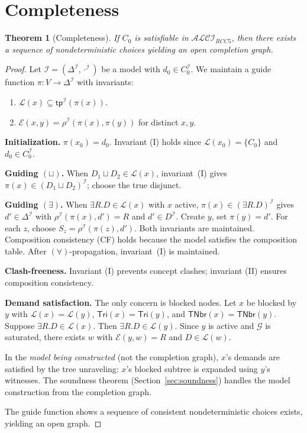 \documentclass[a4paper,11pt]{article}
\newtheorem{theorem}{Theorem}[section]
\theoremstyle{definition}
\newcommand{\ALCIRCC}[1]{\ensuremath{\mathcal{ALCI}_{\mathit{RCC#1}}}}
\newcommand{\tp}{\ensuremath{\mathsf{tp}}}
\newcommand{\Tri}{\ensuremath{\mathsf{Tri}}}
\newcommand{\TNbr}{\ensuremath{\mathsf{TNbr}}}
\newcommand{\interp}{\ensuremath{\mathcal{I}}}
\newcommand{\DeltaI}{\ensuremath{\Delta^{\mathcal{I}}}}
\newcommand{\GG}{\ensuremath{\mathcal{G}}}
\newcommand{\LL}{\ensuremath{\mathcal{L}}}
\newcommand{\EE}{\ensuremath{\mathcal{E}}}
\begin{document}
\section{Completeness}\label{sec:completeness}

\begin{theorem}[Completeness]\label{thm:completeness}
If $C_0$ is satisfiable in $\ALCIRCC{5}$, then there exists a
sequence of nondeterministic choices yielding an open completion
graph.
\end{theorem}

\begin{proof}
Let $\interp = (\DeltaI, \cdot^{\interp})$ be a model with
$d_0 \in C_0^{\interp}$.  We maintain a guide function
$\pi: V \to \DeltaI$ with invariants:
\begin{enumerate}[nosep,label=(\Roman*)]
  \item $\LL(x) \subseteq \tp^{\interp}(\pi(x))$.
  \item $\EE(x,y) = \rho^{\interp}(\pi(x), \pi(y))$ for
    distinct $x, y$.
\end{enumerate}

\medskip\noindent\textbf{Initialization.}\;
$\pi(x_0) = d_0$.  Invariant (I) holds since
$\LL(x_0) = \{C_0\}$ and $d_0 \in C_0^{\interp}$.

\medskip\noindent\textbf{Guiding $(\sqcup)$.}\;
When $D_1 \sqcup D_2 \in \LL(x)$, invariant~(I) gives
$\pi(x) \in (D_1 \sqcup D_2)^{\interp}$; choose the true
disjunct.

\medskip\noindent\textbf{Guiding $(\exists)$.}\;
When $\exists R.D \in \LL(x)$ with $x$ active,
$\pi(x) \in (\exists R.D)^{\interp}$ gives
$d' \in \DeltaI$ with $\rho^{\interp}(\pi(x), d') = R$ and
$d' \in D^{\interp}$.  Create $y$, set $\pi(y) = d'$.  For
each $z$, choose $S_z = \rho^{\interp}(\pi(z), d')$.
Both invariants are maintained.  Composition consistency (CF)
holds because the model satisfies the composition table.
After $(\forall)$-propagation, invariant~(I) is maintained.

\medskip\noindent\textbf{Clash-freeness.}\;
Invariant (I) prevents concept clashes; invariant (II) ensures
composition consistency.

\medskip\noindent\textbf{Demand satisfaction.}\;
The only concern is blocked nodes.  Let $x$ be blocked by $y$
with $\LL(x) = \LL(y)$, $\Tri(x) = \Tri(y)$, and
$\TNbr(x) = \TNbr(y)$.  Suppose
$\exists R.D \in \LL(x)$.  Then $\exists R.D \in \LL(y)$.
Since $y$ is active and $\GG$ is saturated, there exists
$w$ with $\EE(y,w) = R$ and $D \in \LL(w)$.

In the \emph{model being constructed} (not the completion graph),
$x$'s demands are satisfied by the tree unraveling: $x$'s
blocked subtree is expanded using $y$'s witnesses.  The
soundness theorem (Section~\ref{sec:soundness}) handles the
model construction from the completion graph.

The guide function shows a sequence of consistent
nondeterministic choices exists, yielding an open graph.
\end{proof}
\end{document}
